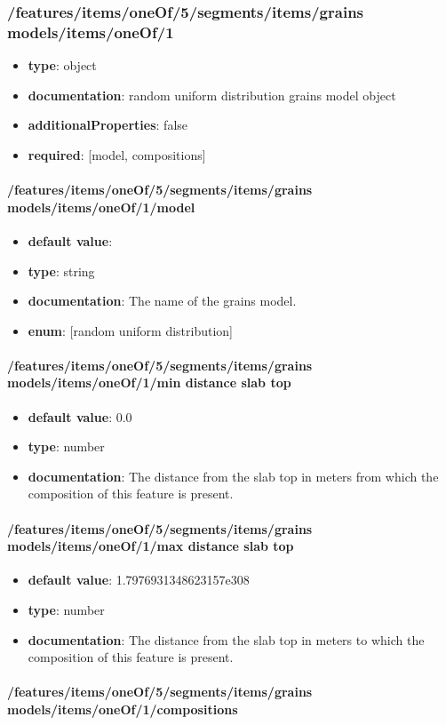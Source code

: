 \subsubsection{/features/items/oneOf/5/segments/items/grains models/items/oneOf/1}
\begin{itemize}\item {\bf type}: object
\item {\bf documentation}: random uniform distribution grains model object
\item {\bf additionalProperties}: false
\item {\bf required}: [model, compositions]\end{itemize}
\paragraph{/features/items/oneOf/5/segments/items/grains models/items/oneOf/1/model}
\begin{itemize}\item {\bf default value}: 
\item {\bf type}: string
\item {\bf documentation}: The name of the grains model.
\item {\bf enum}: [random uniform distribution]\end{itemize}\paragraph{/features/items/oneOf/5/segments/items/grains models/items/oneOf/1/min distance slab top}
\begin{itemize}\item {\bf default value}: 0.0
\item {\bf type}: number
\item {\bf documentation}: The distance from the slab top in meters from which the composition of this feature is present.
\end{itemize}\paragraph{/features/items/oneOf/5/segments/items/grains models/items/oneOf/1/max distance slab top}
\begin{itemize}\item {\bf default value}: 1.7976931348623157e308
\item {\bf type}: number
\item {\bf documentation}: The distance from the slab top in meters to which the composition of this feature is present.
\end{itemize}\paragraph{/features/items/oneOf/5/segments/items/grains models/items/oneOf/1/compositions}
